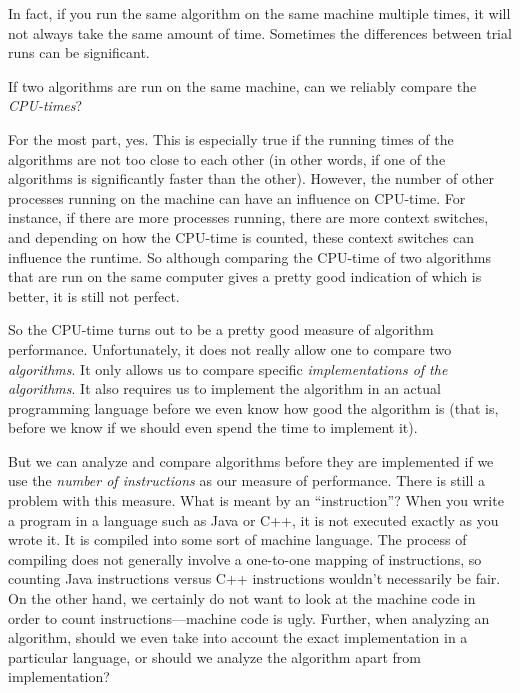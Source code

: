 In fact, if you run the same algorithm on the same machine multiple times, 
it will not always take the same amount of time.  
Sometimes the differences between trial runs can be significant.

\begin{ques}
If two algorithms are run on the same machine, can we reliably compare the {\em CPU-times}?

\noindent
\answerlinethree
\begin{answer}
For the most part, yes.  This is especially true if the running times of the algorithms
are not too close to each other (in other words, if one of the algorithms is significantly
faster than the other).
However, the number of other processes running on the machine 
can have an influence on CPU-time.  For instance, if there are more processes running,
there are more context switches, and depending on how the CPU-time is counted, these context
switches can influence the runtime.  So although comparing the CPU-time of two algorithms
that are run on the same computer gives a pretty good indication of which is better, it
is still not perfect.
\end{answer}
\end{ques}

So the CPU-time turns out to be a pretty good measure of algorithm performance. 
Unfortunately, it does not really allow one to compare two {\em algorithms}.  It only allows
us to compare specific {\em implementations of the algorithms}.  
It also requires us to implement the algorithm in an actual programming language before we
even know how good the algorithm is (that is, before we know if we should even spend the
time to implement it).

But we can analyze and compare algorithms before they are implemented if we use
the {\em number of instructions} as our measure of performance.  
There is still a problem with this measure.  
What is meant by an ``instruction''?  
When you write a program in a language such as Java or C++, it is not executed exactly
as you wrote it.  It is compiled into some sort of machine language.  
The process of compiling does not
generally involve a one-to-one mapping of instructions, 
so counting Java instructions versus C++ instructions
wouldn't necessarily be fair.  
On the other hand, we certainly do not want to look at the machine code in
order to count instructions---machine code is ugly.
Further, when analyzing an algorithm, should we even take into account the exact 
implementation in a particular language, or should we analyze the algorithm apart from implementation?

